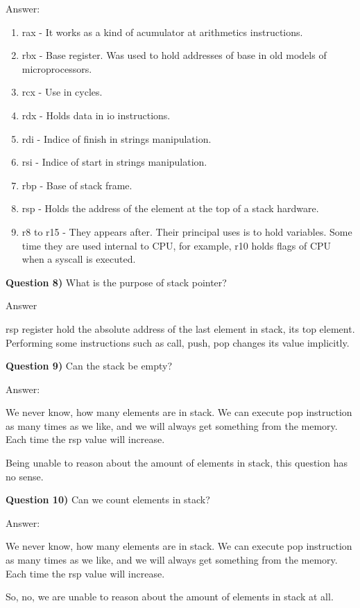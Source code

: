 \documentclass[11pt, a4paper]{amsart}
\numberwithin{equation}{section}
\theoremstyle{plain} %
\theoremstyle{definition}
\theoremstyle{remark}
\begin{document}
Answer:

\begin{enumerate}
    \item rax - It works as a kind of acumulator at arithmetics instructions.
    \item rbx - Base register. Was used to hold addresses of base in old models of microprocessors.
    \item rcx - Use in cycles.
    \item rdx - Holds data in io instructions.
    \item rdi - Indice of finish in strings manipulation.
    \item rsi - Indice of start in strings manipulation.
    \item rbp - Base of stack frame.
    \item rsp - Holds the address of the element at the top of a stack hardware.
    \item r8 to r15 - They appears after. Their principal uses is to hold variables. Some time they are used internal to CPU,
    for example, r10 holds flags of CPU when a syscall is executed.
\end{enumerate}

\textbf{Question 8)} What is the purpose of stack pointer?

Answer

	rsp register hold the absolute address of the last element in stack, its top element. Performing some instructions such as call, push, pop changes its value implicitly.
	
\textbf{Question 9)} Can the stack be empty?

Answer:

	We never know, how many elements are in stack. We can execute pop instruction as many times as we like, and we will always get something from the memory. Each time the rsp value will increase.

Being unable to reason about the amount of elements in stack, this question has no sense.

\textbf{Question 10)} Can we count elements in stack?

Answer:

	We never know, how many elements are in stack. We can execute pop instruction as many times as we like, and we will always get something from the memory. Each time the rsp value will increase.

So, no, we are unable to reason about the amount of elements in stack at all.
\end{document}
